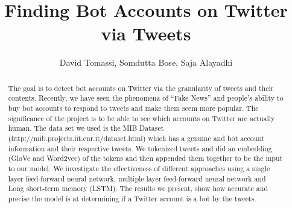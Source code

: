 \documentclass[a4paper,12pt]{article}
\title{Finding Bot Accounts on Twitter via Tweets}
\author{David Tomassi, Somdutta Bose, Saja Alayadhi}
\begin{document}
\maketitle

\begin{abstract}
The goal is to detect bot accounts on Twitter via the granularity of tweets and their contents. Recently, we have seen the phenomena of ``Fake News'' and people's ability to buy bot accounts to respond to tweets and make them seem more popular. The significance of the project is to be able to see which accounts on Twitter are actually human. The data set we used is the MIB Dataset (http://mib.projects.iit.cnr.it/dataset.html) which has a genuine and bot account information and their respective tweets. We tokenized tweets and did an embedding (GloVe and Word2vec) of the tokens and then appended them together to be the input to our model. We investigate the effectiveness of different approaches using a single layer feed-forward neural network, multiple layer feed-forward neural network and Long short-term memory (LSTM). The results we present, show how accurate and precise the model is at determining if a Twitter account is a bot by the tweets.
\end{abstract}













%







\end{document}
